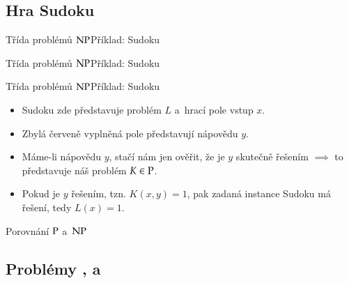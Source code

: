 \documentclass[11pt,professionalfont,aspectratio=43]{beamer}
\begin{document}
    \subsection{Hra Sudoku}

    \begin{frame}{Třída problémů $\operatorname{NP}$}{Příklad: Sudoku}
    \end{frame}

    \begin{frame}{Třída problémů $\operatorname{NP}$}{Příklad: Sudoku}
    \end{frame}

    \begin{frame}{Třída problémů $\operatorname{NP}$}{Příklad: Sudoku}
        \begin{itemize}
            \item Sudoku zde představuje problém $L$ a~hrací pole vstup $x$.
            \item Zbylá červeně vyplněná pole představují nápovědu $y$.
            \item Máme-li nápovědu $y$, stačí nám jen ověřit, že je $y$ skutečně řešením $\implies$ to představuje náš problém $K\in\operatorname{P}$.
            \item Pokud je $y$ řešením, tzn. $K(x,y)=1$, pak zadaná instance Sudoku má řešení, tedy $L(x)=1$.
        \end{itemize}
    \end{frame}

    \begin{frame}{Porovnání $\operatorname{P}$ a~$\operatorname{NP}$}
    \end{frame}

    \subsection{Problémy \SAT, \INDSET{} a~\CLIQUE}
\end{document}
